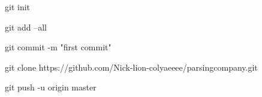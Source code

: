 
     git init

     git add --all

     git commit -m "first commit"


     git  clone https://github.com/Nick-lion-colyaeeee/parsingcompany.git


         git push -u origin master

